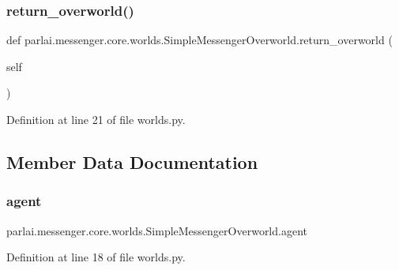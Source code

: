 \subsubsection{\texorpdfstring{return\+\_\+overworld()}{return\_overworld()}}
{\footnotesize\ttfamily def parlai.\+messenger.\+core.\+worlds.\+Simple\+Messenger\+Overworld.\+return\+\_\+overworld (\begin{DoxyParamCaption}\item[{}]{self }\end{DoxyParamCaption})}



Definition at line 21 of file worlds.\+py.



\subsection{Member Data Documentation}
\mbox{\label{classparlai_1_1messenger_1_1core_1_1worlds_1_1SimpleMessengerOverworld_a472033ed4692a277fe07babce008f6d1}} 
\subsubsection{\texorpdfstring{agent}{agent}}
{\footnotesize\ttfamily parlai.\+messenger.\+core.\+worlds.\+Simple\+Messenger\+Overworld.\+agent}



Definition at line 18 of file worlds.\+py.



